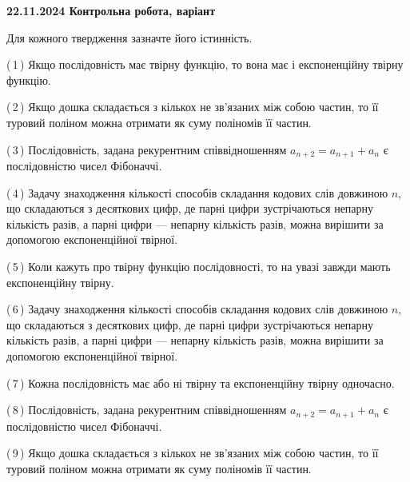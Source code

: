 \documentclass[12pt, ukrainian]{article}
\begin{document}
\begin {large}
\begin {large}
\begin {large}
\begin {large}
\begin {large}
\begin {large}
\begin {large}
\begin {large}
\begin {large}
\begin {large}
\begin {large}
\begin {large}
\begin {large}
\begin {large}
\begin {large}
\begin {large}
\begin {large}
\begin {large}
\begin {large}
\begin {large}
\begin {large}
\begin {large}
\begin {large}
\begin {large}
\begin {large}
\begin {large}
\begin {large}
\begin {large}
\begin {large}

\textbf{22.11.2024 Контрольна робота, варіант  }\par


{
Для кожного твердження зазначте його істинність.\par

\vspace{2mm}

(\,1\,) Якщо послідовність має твірну функцію, то вона має і експоненційну твірну функцію.%



(\,2\,) Якщо дошка складається з кількох не зв’язаних між собою частин, то її туровий поліном можна отримати як суму поліномів її частин.%



(\,3\,) Послідовність, задана рекурентним співвідношенням $a_{n+2}=a_{n+1}+a_{n}$ є послідовністю чисел Фібоначчі.%



(\,4\,) Задачу знаходження кількості способів складання кодових слів довжиною $n$, що складаються з десяткових цифр, де парні цифри зустрічаються непарну кількість разів, а парні цифри — непарну кількість разів, можна вирішити за допомогою експоненційної твірної.%



(\,5\,) Коли кажуть про твірну функцію послідовності, то на увазі завжди мають експоненційну твірну.%



(\,6\,) Задачу знаходження кількості способів складання кодових слів довжиною $n$, що складаються з десяткових цифр, де парні цифри зустрічаються непарну кількість разів, а парні цифри — непарну кількість разів, можна вирішити за допомогою експоненційної твірної.%



(\,7\,) Кожна послідовність має або ні твірну та експоненційну твірну одночасно.%



(\,8\,) Послідовність, задана рекурентним співвідношенням $a_{n+2}=a_{n+1}+a_{n}$ є послідовністю чисел Фібоначчі.%



(\,9\,) Якщо дошка складається з кількох не зв’язаних між собою частин, то її туровий поліном можна отримати як суму поліномів її частин.%



}
\end{large}
\end{large}
\end{large}
\end{large}
\end{large}
\end{large}
\end{large}
\end{large}
\end{large}
\end{large}
\end{large}
\end{large}
\end{large}
\end{large}
\end{large}
\end{large}
\end{large}
\end{large}
\end{large}
\end{large}
\end{large}
\end{large}
\end{large}
\end{large}
\end{large}
\end{large}
\end{large}
\end{large}
\end{large}
\end{document}
